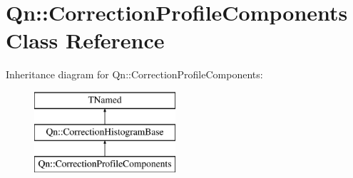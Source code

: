 \hypertarget{classQn_1_1CorrectionProfileComponents}{}\section{Qn\+:\+:Correction\+Profile\+Components Class Reference}
\label{classQn_1_1CorrectionProfileComponents}
Inheritance diagram for Qn\+:\+:Correction\+Profile\+Components\+:\begin{figure}[H]
\begin{center}
\leavevmode
\includegraphics[height=3.000000cm]{classQn_1_1CorrectionProfileComponents}
\end{center}
\end{figure}
